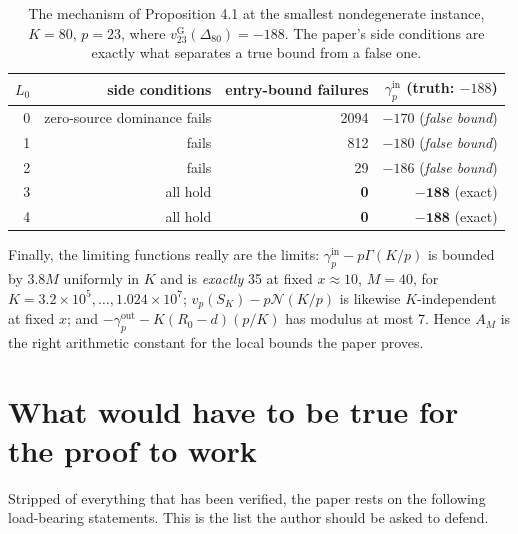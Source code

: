 \documentclass[11pt]{article}
\theoremstyle{definition}
\newcommand{\gin}{\gamma_p^{\mathrm{in}}}
\newcommand{\gout}{\gamma_p^{\mathrm{out}}}
\begin{document}
\begin{table}[htbp]
\centering
\begin{tabular}{@{}rrrr@{}}
\toprule
$L_0$ & side conditions & entry-bound failures & $\gin$ (truth: $-188$) \\
\midrule
0 & zero-source dominance fails & 2094 & $-170$ \quad(\emph{false bound}) \\
1 & fails & 812 & $-180$ \quad(\emph{false bound}) \\
2 & fails & 29 & $-186$ \quad(\emph{false bound}) \\
3 & all hold & \textbf{0} & $\mathbf{-188}$ \quad(exact) \\
4 & all hold & \textbf{0} & $\mathbf{-188}$ \quad(exact) \\
\bottomrule
\end{tabular}
\caption{The mechanism of Proposition 4.1 at the smallest nondegenerate instance, $K=80$,
$p=23$, where $v_{23}^{\mathrm{G}}(\Delta_{80})=-188$. The paper's side conditions are exactly
what separates a true bound from a false one.}
\label{tab:inner}
\end{table}

Finally, the limiting functions really are the limits: $\gin-p\Gamma(K/p)$ is bounded by $3.8M$
uniformly in $K$ and is \emph{exactly} 35 at fixed $x\approx10$, $M=40$, for
$K=3.2\times10^5,\dots,1.024\times10^7$; $v_p(S_K)-p\mathcal{N}(K/p)$ is likewise $K$-independent
at fixed $x$; and $-\gout-K(R_0-d)(p/K)$ has modulus at most 7. Hence $A_M$ is the right
arithmetic constant for the local bounds the paper proves.

\section{What would have to be true for the proof to work}\label{sec:musthold}

Stripped of everything that has been verified, the paper rests on the following load-bearing
statements. This is the list the author should be asked to defend.
\end{document}
